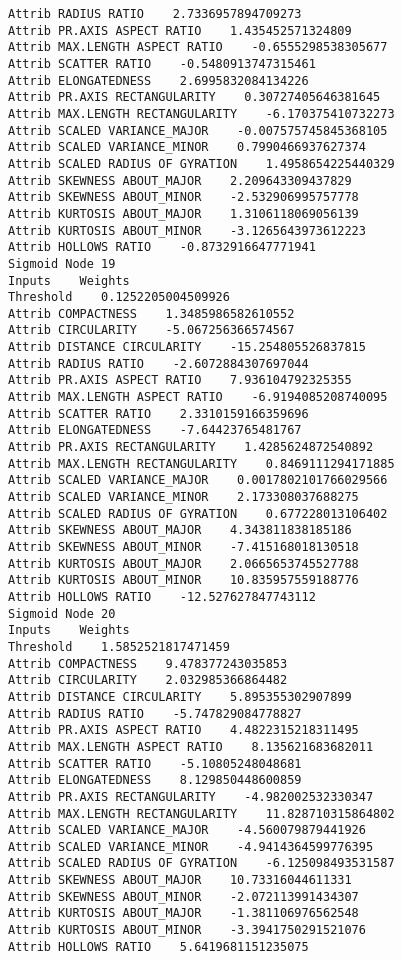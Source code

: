 \documentclass[
	article,			%
	11pt,				%
	oneside,			%
	a4paper,			%
	english,			%
	brazil,				%
	sumario=tradicional
	]{abntex2}
\begin{document}
\begin{lstlisting}
Attrib RADIUS RATIO    2.7336957894709273
Attrib PR.AXIS ASPECT RATIO    1.435452571324809
Attrib MAX.LENGTH ASPECT RATIO    -0.6555298538305677
Attrib SCATTER RATIO    -0.5480913747315461
Attrib ELONGATEDNESS    2.6995832084134226
Attrib PR.AXIS RECTANGULARITY    0.30727405646381645
Attrib MAX.LENGTH RECTANGULARITY    -6.170375410732273
Attrib SCALED VARIANCE_MAJOR    -0.007575745845368105
Attrib SCALED VARIANCE_MINOR    0.7990466937627374
Attrib SCALED RADIUS OF GYRATION    1.4958654225440329
Attrib SKEWNESS ABOUT_MAJOR    2.209643309437829
Attrib SKEWNESS ABOUT_MINOR    -2.532906995757778
Attrib KURTOSIS ABOUT_MAJOR    1.3106118069056139
Attrib KURTOSIS ABOUT_MINOR    -3.1265643973612223
Attrib HOLLOWS RATIO    -0.8732916647771941
Sigmoid Node 19
Inputs    Weights
Threshold    0.1252205004509926
Attrib COMPACTNESS    1.3485986582610552
Attrib CIRCULARITY    -5.067256366574567
Attrib DISTANCE CIRCULARITY    -15.254805526837815
Attrib RADIUS RATIO    -2.6072884307697044
Attrib PR.AXIS ASPECT RATIO    7.936104792325355
Attrib MAX.LENGTH ASPECT RATIO    -6.9194085208740095
Attrib SCATTER RATIO    2.3310159166359696
Attrib ELONGATEDNESS    -7.64423765481767
Attrib PR.AXIS RECTANGULARITY    1.4285624872540892
Attrib MAX.LENGTH RECTANGULARITY    0.8469111294171885
Attrib SCALED VARIANCE_MAJOR    0.0017802101766029566
Attrib SCALED VARIANCE_MINOR    2.173308037688275
Attrib SCALED RADIUS OF GYRATION    0.677228013106402
Attrib SKEWNESS ABOUT_MAJOR    4.343811838185186
Attrib SKEWNESS ABOUT_MINOR    -7.415168018130518
Attrib KURTOSIS ABOUT_MAJOR    2.0665653745527788
Attrib KURTOSIS ABOUT_MINOR    10.835957559188776
Attrib HOLLOWS RATIO    -12.527627847743112
Sigmoid Node 20
Inputs    Weights
Threshold    1.5852521817471459
Attrib COMPACTNESS    9.478377243035853
Attrib CIRCULARITY    2.032985366864482
Attrib DISTANCE CIRCULARITY    5.895355302907899
Attrib RADIUS RATIO    -5.747829084778827
Attrib PR.AXIS ASPECT RATIO    4.4822315218311495
Attrib MAX.LENGTH ASPECT RATIO    8.135621683682011
Attrib SCATTER RATIO    -5.10805248048681
Attrib ELONGATEDNESS    8.129850448600859
Attrib PR.AXIS RECTANGULARITY    -4.982002532330347
Attrib MAX.LENGTH RECTANGULARITY    11.828710315864802
Attrib SCALED VARIANCE_MAJOR    -4.560079879441926
Attrib SCALED VARIANCE_MINOR    -4.9414364599776395
Attrib SCALED RADIUS OF GYRATION    -6.125098493531587
Attrib SKEWNESS ABOUT_MAJOR    10.73316044611331
Attrib SKEWNESS ABOUT_MINOR    -2.072113991434307
Attrib KURTOSIS ABOUT_MAJOR    -1.381106976562548
Attrib KURTOSIS ABOUT_MINOR    -3.3941750291521076
Attrib HOLLOWS RATIO    5.6419681151235075

\end{lstlisting}
\end{document}
